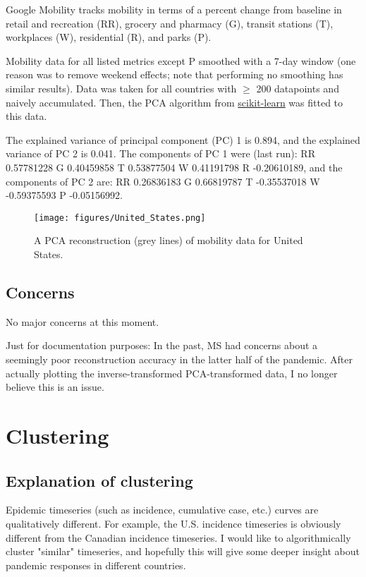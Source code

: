 \documentclass{article}
\begin{document}
Google Mobility tracks mobility in terms of a percent change from baseline in retail and recreation (RR), grocery and pharmacy (G), transit stations (T), workplaces (W), residential (R), and parks (P).

Mobility data for all listed metrics except P smoothed with a 7-day window (one reason was to remove weekend effects; note that performing no smoothing has similar results). Data was taken for all countries with $\geq$ 200 datapoints and naively accumulated. Then, the PCA algorithm from \href{https://scikit-learn.org/stable/}{scikit-learn} was fitted to this data. 

The explained variance of principal component (PC) 1 is 0.894, and the explained variance of PC 2 is 0.041. The components of PC 1 were (last run): RR 0.57781228  G 0.40459858 T 0.53877504  W 0.41191798 R -0.20610189, and the components of PC 2 are: RR 0.26836183  G 0.66819787 T -0.35537018 W -0.59375593 P -0.05156992.

\begin{figure}[h!]
    \centering
    \texttt{[image: figures/United\_States.png]}
    \caption{A PCA reconstruction (grey lines) of mobility data for United States.}
    \label{fig:my_label}
\end{figure}


\subsection{Concerns}
No major concerns at this moment. 

Just for documentation purposes: In the past, MS had concerns about a seemingly poor reconstruction accuracy in the latter half of the pandemic. After actually plotting the inverse-transformed PCA-transformed data, I no longer believe this is an issue.


\section{Clustering}
\subsection{Explanation of clustering}
Epidemic timeseries (such as incidence, cumulative case, etc.) curves are qualitatively different. For example, the U.S. incidence timeseries is obviously different from the Canadian incidence timeseries. I would like to algorithmically cluster "similar" timeseries, and hopefully this will give some deeper insight about pandemic responses in different countries. 
\end{document}
